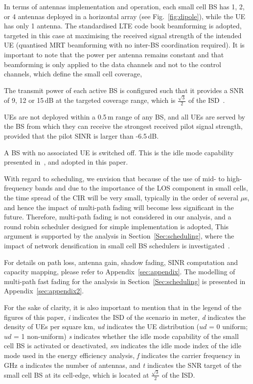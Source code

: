 \documentclass{IEEEtran}
\begin{document}
In terms of antennas implementation and operation,
each small cell \ac{BS} has 1, 2, or 4 antennas deployed in a horizontal array (see Fig.~\ref{fig:dipole}),
while the \ac{UE} has only 1 antenna.
The standardised \ac{LTE} code book beamforming is adopted,
targeted in this case at maximising the received signal strength of the intended \ac{UE}
(quantised \ac{MRT} beamforming with no inter-\ac{BS} coordination required).
It is important to note that the power per antenna remains constant 
and that  beamforming is only applied to the data channels and not to the control channels,
which define the small cell coverage,


The transmit power of each active \ac{BS} is configured such that it provides a \ac{SNR} of 9, 12 or 15\,dB at the targeted coverage range,
which is $\frac{\sqrt{3}}{2}$ of the \ac{ISD}~\cite{Claussen:08a}.


\acp{UE} are not deployed within a 0.5\,m range of any \ac{BS},
and all \acp{UE} are served by the \ac{BS} from which they can receive the strongest received pilot signal strength,
provided that the pilot \ac{SINR} is larger than -6.5\,dB.

A \ac{BS} with no associated \ac{UE} is switched off.
This is the idle mode capability presented in~\cite{Ashraf:10a},
and adopted in this paper.

With regard to scheduling,
we envision that because of the use of mid- to high-frequency bands and due to the importance of the \ac{LOS} component in small cells,
the time spread of the \ac{CIR} will be very small,
typically in the order of several $\mu$s,
and hence the impact of multi-path fading will become less significant in the future.
Therefore, multi-path fading is not considered in our analysis,
and a round robin scheduler designed for simple implementation is adopted,
This argument is supported by the analysis in Section~\ref{Sec:scheduling},
where the impact of network densification in small cell \ac{BS} schedulers is investigated~\cite{2015Jafari}.


For details on path loss, antenna gain, shadow fading, \ac{SINR} computation and capacity mapping,
please refer to Appendix~\ref{sec:appendix}.
The modelling of multi-path fast fading for the analysis in Section~\ref{Sec:scheduling} is presented in Appendix~\ref{sec:appendix2}.


For the sake of clarity,
it is also important to mention that in the legend of the figures of this paper,
\emph{i} indicates the \ac{ISD} of the scenario in meter,
\emph{d} indicates the density of \acp{UE} per square km,
\emph{ud} indicates the UE distribution ($ud$ = 0 uniform; $ud$ = 1 non-uniform)
\emph{s} indicates whether the idle mode capability of the small cell \ac{BS} is activated or deactivated,
\emph{sm} indicates the idle mode index of the idle mode used in the energy efficiency analysis,
\emph{f} indicates the carrier frequency in GHz
\emph{a} indicates the number of antennas, and
\emph{t} indicates the \ac{SNR} target of the small cell \ac{BS} at its cell-edge,
which is located at $\frac{\sqrt{3}}{2}$ of the \ac{ISD}.
\end{document}
